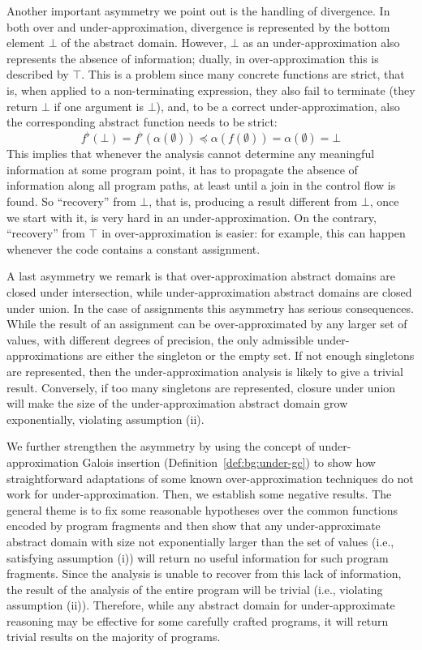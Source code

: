 Another important asymmetry we point out is the handling of divergence.
In both over and under-approximation, divergence is represented by the bottom element $\bot$ of the abstract domain. However, $\bot$ as an under-approximation also represents the absence of information; dually, in over-approximation this is described by $\top$. This is a problem since many concrete functions are strict, that is, when applied to a non-terminating expression, they also fail to terminate (they return $\bot$ if one argument is $\bot$), and, to be a correct under-approximation, also the corresponding abstract function needs to be strict:
\[
f^{\flat}(\bot) = f^{\flat}(\alpha(\emptyset)) \preceq \alpha(f(\emptyset)) = \alpha(\emptyset) = \bot
\]
This implies that whenever the analysis cannot determine any meaningful information at some program point, it has to propagate the absence of information along all program paths, at least until a join in the control flow is found.
So ``recovery'' from $\bot$, that is, producing a result different from $\bot$, once we start with it, is very hard in an under-approximation. On the contrary, ``recovery'' from $\top$ in over-approximation is easier: for example, this can happen whenever the code contains a constant assignment.

A last asymmetry we remark is that over-approximation abstract domains are closed under intersection, while under\hyp{}approximation abstract domains are closed under union. In the case of assignments this asymmetry has serious consequences. While the result of an assignment can be over-approximated by any larger set of values, with different degrees of precision, the only admissible under-approximations are either the singleton or the empty set. If not enough singletons are represented, then the under-approximation analysis is likely to give a trivial result. Conversely, if too many singletons are represented, closure under union will make the size of the under-approximation abstract domain grow exponentially, violating assumption (ii).

We further strengthen the asymmetry by using the concept of under-approximation Galois insertion (Definition~\ref{def:bg:under-gc}) to show how straightforward adaptations of some known over-approximation techniques do not work for under-approximation.
Then, we establish some negative results. The general theme is to fix some reasonable hypotheses over the common functions encoded by program fragments and then show that any under-approximate abstract domain with size not exponentially larger than the set of values (i.e., satisfying assumption (i)) will return no useful information for such program fragments.
Since the analysis is unable to recover from this lack of information, the result of the analysis of the entire program will be trivial (i.e., violating assumption (ii)).
Therefore, while any abstract domain for under-approximate reasoning may be effective for some carefully crafted programs, it will return trivial results on the majority of programs.

